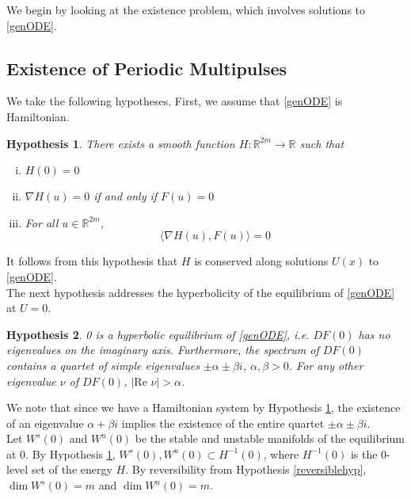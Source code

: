 \documentclass[12pt]{article}
\def\R{{\mathbb R}}
\newtheorem{hypothesis}{Hypothesis}
\begin{document}
We begin by looking at the existence problem, which involves solutions to \eqref{genODE}.

\subsection{Existence of Periodic Multipulses}

We take the following hypotheses. First, we assume that \eqref{genODE} is Hamiltonian.

\begin{hypothesis}\label{Hhyp}
There exists a smooth function $H: \R^{2m} \rightarrow \R$ such that 
\begin{enumerate}[(i)]
\item $H(0) = 0$
\item $\nabla H(u) = 0$ if and only if $F(u) = 0$
\item For all $u \in \R^{2m}$,
\begin{equation}
\langle \nabla H(u), F(u) \rangle = 0
\end{equation}
\end{enumerate}
\end{hypothesis}

It follows from this hypothesis that $H$ is conserved along solutions $U(x)$ to \eqref{genODE}.\\

The next hypothesis addresses the hyperbolicity of the equilibrium of \eqref{genODE} at $U = 0$.  

\begin{hypothesis}\label{hypeq}
0 is a hyperbolic equilibrium of \eqref{genODE}, i.e. $DF(0)$ has no eigenvalues on the imaginary axis. Furthermore, the spectrum of $DF(0)$ contains a quartet of simple eigenvalues $\pm \alpha \pm \beta i$, $\alpha, \beta > 0$. For any other eigenvalue $\nu$ of $DF(0)$, $|\text{Re }\nu| > \alpha$.
\end{hypothesis}

We note that since we have a Hamiltonian system by Hypothesis \ref{Hhyp}, the existence of an eigenvalue $\alpha + \beta i$ implies the existence of the entire quartet $\pm \alpha \pm \beta i$.\\

Let $W^s(0)$ and $W^u(0)$ be the stable and unstable manifolds of the equilibrium at 0. By Hypothesis \ref{Hhyp}, $W^s(0), W^u(0) \subset H^{-1}(0)$, where $H^{-1}(0)$ is the 0-level set of the energy $H$. By reversibility from Hypothesis \ref{reversiblehyp}, $\dim W^s(0) = m$ and $\dim W^u(0) = m$.
\end{document}
